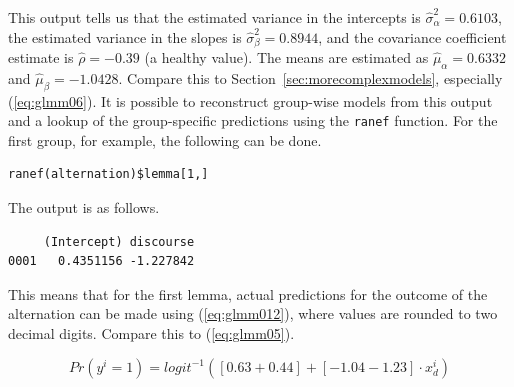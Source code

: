 \documentclass[a4paper,12pt]{article}
\begin{document}
This output tells us that the estimated variance in the intercepts is $\hat{\sigma}_{\alpha}^2=0.6103$, the estimated variance in the slopes is $\hat{\sigma}_{\beta}^2=0.8944$, and the covariance coefficient estimate is $\hat{\rho}=-0.39$ (a healthy value).
The means are estimated as $\hat{\mu}_{\alpha}=0.6332$ and $\hat{\mu}_{\beta}=-1.0428$.
Compare this to Section~\ref{sec:morecomplexmodels}, especially (\ref{eq:glmm06}).
It is possible to reconstruct group-wise models from this output and a lookup of the group-specific predictions using the \texttt{ranef} function.
For the first group, for example, the following can be done.

\vspace{0.5\baselineskip}

\begin{lstlisting}
ranef(alternation)$lemma[1,]
\end{lstlisting}

The output is as follows.

\vspace{0.5\baselineskip}

\begin{lstlisting}
     (Intercept) discourse
0001   0.4351156 -1.227842
\end{lstlisting}

This means that for the first lemma, actual predictions for the outcome of the alternation can be made using (\ref{eq:glmm012}), where values are rounded to two decimal digits.
Compare this to (\ref{eq:glmm05}).

\begin{equation}
  Pr(y^i=1)=logit^{-1}( [0.63+0.44] + [-1.04-1.23]\cdot x_d^i )
  \label{eq:glmm012}
\end{equation}

% 
\end{document}
